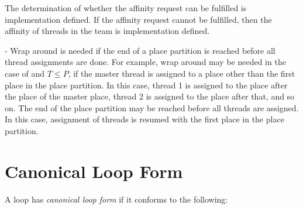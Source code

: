 The determination of whether the affinity request can be fulfilled is implementation defined. If the affinity request cannot be fulfilled, then the affinity of threads in the team is implementation defined.

\notestart
\noteheader - Wrap around is needed if the end of a place partition is reached before all thread assignments are done. For example, wrap around may be needed in the case of  and $T\leq P$, if the master thread is assigned to a place other than the first place in the place partition. In this case, thread 1 is assigned to the place after the place of the master place, thread 2 is assigned to the place after that, and so on. The end of the place partition may be reached before all threads are assigned. In this case, assignment of threads is resumed with the first place in the place partition.
\noteend


\section{Canonical Loop Form}
\label{sec:Canonical Loop Form}
\ccppspecificstart
A loop has \emph{canonical loop form} if it conforms to the following:

